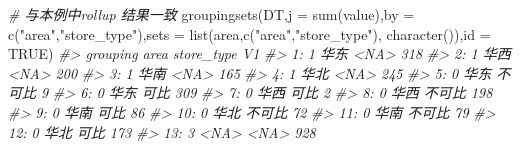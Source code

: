 \documentclass[
]{book}
\newenvironment{Shaded}{\begin{snugshade}}{\end{snugshade}}
\newcommand{\AttributeTok}[1]{\textcolor[rgb]{0.77,0.63,0.00}{#1}}
\newcommand{\CommentTok}[1]{\textcolor[rgb]{0.56,0.35,0.01}{\textit{#1}}}
\newcommand{\ConstantTok}[1]{\textcolor[rgb]{0.00,0.00,0.00}{#1}}
\newcommand{\FunctionTok}[1]{\textcolor[rgb]{0.00,0.00,0.00}{#1}}
\newcommand{\NormalTok}[1]{#1}
\newcommand{\StringTok}[1]{\textcolor[rgb]{0.31,0.60,0.02}{#1}}
\begin{document}
\begin{Shaded}
\begin{Highlighting}[]
\CommentTok{\# 与本例中rollup 结果一致}
\FunctionTok{groupingsets}\NormalTok{(DT,}\AttributeTok{j =} \FunctionTok{sum}\NormalTok{(value),}\AttributeTok{by =} \FunctionTok{c}\NormalTok{(}\StringTok{"area"}\NormalTok{,}\StringTok{"store\_type"}\NormalTok{),}\AttributeTok{sets =} \FunctionTok{list}\NormalTok{(}\StringTok{\textquotesingle{}area\textquotesingle{}}\NormalTok{,}\FunctionTok{c}\NormalTok{(}\StringTok{"area"}\NormalTok{,}\StringTok{"store\_type"}\NormalTok{), }\FunctionTok{character}\NormalTok{()),}\AttributeTok{id =} \ConstantTok{TRUE}\NormalTok{)}
\CommentTok{\#\textgreater{}     grouping area store\_type  V1}
\CommentTok{\#\textgreater{}  1:        1 华东       \textless{}NA\textgreater{} 318}
\CommentTok{\#\textgreater{}  2:        1 华西       \textless{}NA\textgreater{} 200}
\CommentTok{\#\textgreater{}  3:        1 华南       \textless{}NA\textgreater{} 165}
\CommentTok{\#\textgreater{}  4:        1 华北       \textless{}NA\textgreater{} 245}
\CommentTok{\#\textgreater{}  5:        0 华东     不可比   9}
\CommentTok{\#\textgreater{}  6:        0 华东       可比 309}
\CommentTok{\#\textgreater{}  7:        0 华西       可比   2}
\CommentTok{\#\textgreater{}  8:        0 华西     不可比 198}
\CommentTok{\#\textgreater{}  9:        0 华南       可比  86}
\CommentTok{\#\textgreater{} 10:        0 华北     不可比  72}
\CommentTok{\#\textgreater{} 11:        0 华南     不可比  79}
\CommentTok{\#\textgreater{} 12:        0 华北       可比 173}
\CommentTok{\#\textgreater{} 13:        3 \textless{}NA\textgreater{}       \textless{}NA\textgreater{} 928}


\end{Highlighting}
\end{Shaded}
\end{document}
